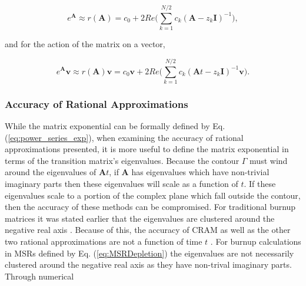 \begin{equation}
    e^{\boldsymbol{A}} \approx r(\boldsymbol{A}) = c_{0} + 2Re\Bigg( \sum_{k=1}^{N/2}c_{k}(\boldsymbol{A} - z_{k}\boldsymbol{I})^{-1}\Bigg), 
\end{equation}

\noindent and for the action of the matrix on a vector,

\begin{equation}
    e^{\boldsymbol{A}}\boldsymbol{v} \approx r(\boldsymbol{A})\boldsymbol{v} = c_{0}\boldsymbol{v} + 2Re\Bigg( \sum_{k=1}^{N/2}c_{k}(\boldsymbol{A}t - z_{k}\boldsymbol{I})^{-1}\boldsymbol{v}\Bigg).
    \label{eq:CRAMVector}
\end{equation}

\subsubsection{Accuracy of Rational Approximations}
While the matrix exponential can be formally defined by Eq. (\ref{eq:power_series_exp}), when examining the accuracy of rational approximations presented, it is more useful to define the matrix exponential in terms of the transition matrix's eigenvalues. Because the contour $\Gamma$ must wind around the eigenvalues of $\boldsymbol{A}t$, if $\boldsymbol{A}$ has eigenvalues which have non-trivial imaginary parts then these eigenvalues will scale as a function of $t$. If these eigenvalues scale to a portion of the complex plane which fall outside the contour, then the accuracy of these methods can be compromised. For traditional burnup matrices it was stated earlier that the eigenvalues are clustered around the negative real axis \cite{pusa2010}. Because of this, the accuracy of CRAM as well as the other two rational approximations are not a function of time $t$ \cite{pusaAccruacy2013}. For burnup calculations in MSRs defined by Eq. (\ref{eq:MSRDepletion}) the eigenvalues are not necessarily clustered around the negative real axis as they have non-trival imaginary parts. Through numerical 

\clearpage

